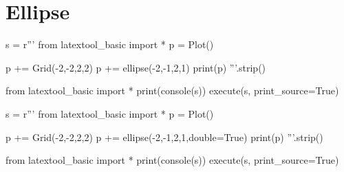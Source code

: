 \section{Ellipse}

\begin{python}
s = r'''
from latextool_basic import *
p = Plot()

p += Grid(-2,-2,2,2)
p += ellipse(-2,-1,2,1)
print(p)
'''.strip()

from latextool_basic import *
print(console(s))
execute(s, print_source=True)
\end{python}

\begin{python}
s = r'''
from latextool_basic import *
p = Plot()

p += Grid(-2,-2,2,2)
p += ellipse(-2,-1,2,1,double=True)
print(p)
'''.strip()


from latextool_basic import *
print(console(s))
execute(s, print_source=True)
\end{python}



